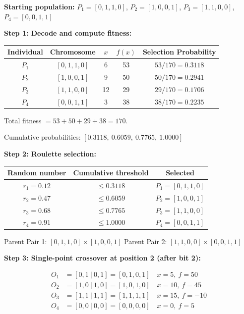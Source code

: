 \documentclass[12pt,a4paper]{article}
\begin{document}
\textbf{Starting population:} $P_1=[0,1,1,0]$, $P_2=[1,0,0,1]$,
$P_3=[1,1,0,0]$, $P_4=[0,0,1,1]$

\textbf{Step 1: Decode and compute fitness:}

\begin{center}
\begin{tabular}{ccccc}
\toprule
Individual & Chromosome & $x$ & $f(x)$ & Selection Probability \\
\midrule
$P_1$ & $[0,1,1,0]$ & 6  & 53 & $53/170 = 0.3118$ \\
$P_2$ & $[1,0,0,1]$ & 9  & 50 & $50/170 = 0.2941$ \\
$P_3$ & $[1,1,0,0]$ & 12 & 29 & $29/170 = 0.1706$ \\
$P_4$ & $[0,0,1,1]$ & 3  & 38 & $38/170 = 0.2235$ \\
\bottomrule
\end{tabular}
\end{center}

Total fitness $= 53 + 50 + 29 + 38 = 170$.

Cumulative probabilities: $[0.3118,\ 0.6059,\ 0.7765,\ 1.0000]$

\textbf{Step 2: Roulette selection:}

\begin{center}
\begin{tabular}{ccc}
\toprule
Random number & Cumulative threshold & Selected \\
\midrule
$r_1 = 0.12$ & $\leq 0.3118$ & $P_1 = [0,1,1,0]$ \\
$r_2 = 0.47$ & $\leq 0.6059$ & $P_2 = [1,0,0,1]$ \\
$r_3 = 0.68$ & $\leq 0.7765$ & $P_3 = [1,1,0,0]$ \\
$r_4 = 0.91$ & $\leq 1.0000$ & $P_4 = [0,0,1,1]$ \\
\bottomrule
\end{tabular}
\end{center}

Parent Pair 1: $[0,1,1,0] \times [1,0,0,1]$ \quad
Parent Pair 2: $[1,1,0,0] \times [0,0,1,1]$

\textbf{Step 3: Single-point crossover at position 2 (after bit 2):}

\begin{align*}
O_1 &= [0,1\ |\ 0,1] = [0,1,0,1] \quad x=5,\ f=50 \\
O_2 &= [1,0\ |\ 1,0] = [1,0,1,0] \quad x=10,\ f=45 \\
O_3 &= [1,1\ |\ 1,1] = [1,1,1,1] \quad x=15,\ f=-10 \\
O_4 &= [0,0\ |\ 0,0] = [0,0,0,0] \quad x=0,\ f=5
\end{align*}
\end{document}
